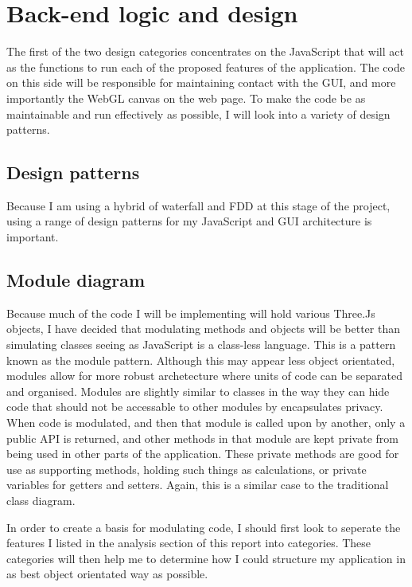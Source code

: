 \section{Back-end logic and design}
The first of the two design categories concentrates on the JavaScript that will act as the functions to run each of the proposed features of the application. The code on this side will be responsible for maintaining contact with the GUI, and more importantly the WebGL canvas on the web page. To make the code be as maintainable and run effectively as possible, I will look into a variety of design patterns.

\subsection{Design patterns}
Because I am using a hybrid of waterfall and FDD at this stage of the project, using a range of design patterns for my JavaScript and GUI architecture is important.

\subsection{Module diagram}
Because much of the code I will be implementing will hold various Three.Js objects, I have decided that modulating methods and objects will be better than simulating classes seeing as JavaScript is a class-less language. This is a pattern known as the module pattern. Although this may appear less object orientated, modules allow for more robust archetecture where units of code can be separated and organised. Modules are slightly similar to classes in the way they can hide code that should not be accessable to other modules by encapsulates privacy. When code is modulated, and then that module is called upon by another, only a public API is returned, and other methods in that module are kept private from being used in other parts of the application. These private methods are good for use as supporting methods, holding such things as calculations, or private variables for getters and setters. Again, this is a similar case to the traditional class diagram.

In order to create a basis for modulating code, I should first look to seperate the features I listed in the analysis section of this report into categories. These categories will then help me to determine how I could structure my application in as best object orientated way as possible.

